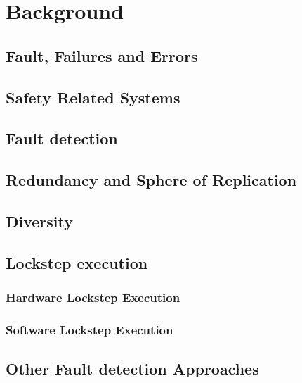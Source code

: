 
\chapter{Background} %

\label{Chapter2} %


\section{Fault, Failures and Errors}
\section{Safety Related Systems}
\section{Fault detection}
\section{Redundancy and Sphere of Replication}
\section{Diversity}
\section{Lockstep execution}
\subsection{Hardware Lockstep Execution}
\subsection{Software Lockstep Execution}
\section{Other Fault detection Approaches}
